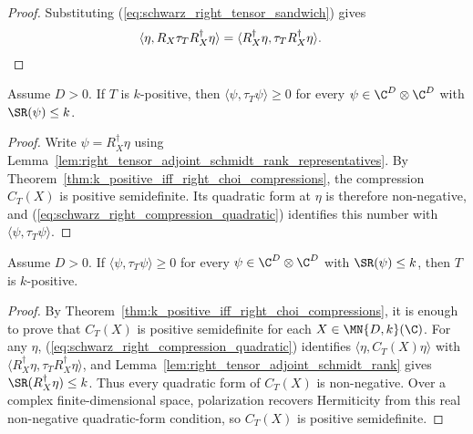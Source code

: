 \begin{proof}
    \leanok
    Substituting (\ref{eq:schwarz_right_tensor_sandwich}) gives
    \begin{align}
        \langle\eta,R_X\tau_T R_X^\dagger\eta\rangle
         & =\langle R_X^\dagger\eta,\tau_T R_X^\dagger\eta\rangle.
        \notag
    \end{align}
\end{proof}

\begin{theorem}
    \label{thm:k_positive_schmidt_rank_choi_expectation}
    \leanok
    Assume $D>0$. If $T$ is $k$-positive, then
    $\langle\psi,\tau_T\psi\rangle\ge0$ for every
    $\psi\in\C^D\otimes\C^D$ with $\SR(\psi)\le k$.
\end{theorem}

\begin{proof}
    \leanok
    Write $\psi=R_X^\dagger\eta$ using
    Lemma~\ref{lem:right_tensor_adjoint_schmidt_rank_representatives}. By
    Theorem~\ref{thm:k_positive_iff_right_choi_compressions}, the
    compression $C_T(X)$ is positive semidefinite. Its quadratic form at
    $\eta$ is therefore non-negative, and
    (\ref{eq:schwarz_right_compression_quadratic}) identifies this number
    with $\langle\psi,\tau_T\psi\rangle$.
\end{proof}

\begin{theorem}
    \label{thm:schmidt_rank_choi_test_converse}
    \leanok
    Assume $D>0$. If $\langle\psi,\tau_T\psi\rangle\ge0$ for every
    $\psi\in\C^D\otimes\C^D$ with $\SR(\psi)\le k$, then $T$ is
    $k$-positive.
\end{theorem}

\begin{proof}
    \leanok
    By Theorem~\ref{thm:k_positive_iff_right_choi_compressions}, it is enough
    to prove that $C_T(X)$ is positive semidefinite for each
    $X\in\MN{D,k}(\C)$. For any $\eta$,
    (\ref{eq:schwarz_right_compression_quadratic}) identifies
    $\langle\eta,C_T(X)\eta\rangle$ with
    $\langle R_X^\dagger\eta,\tau_T R_X^\dagger\eta\rangle$, and
    Lemma~\ref{lem:right_tensor_adjoint_schmidt_rank} gives
    $\SR(R_X^\dagger\eta)\le k$. Thus every quadratic form of $C_T(X)$ is
    non-negative. Over a complex finite-dimensional space, polarization
    recovers Hermiticity from this real non-negative quadratic-form condition,
    so $C_T(X)$ is positive semidefinite.
\end{proof}

